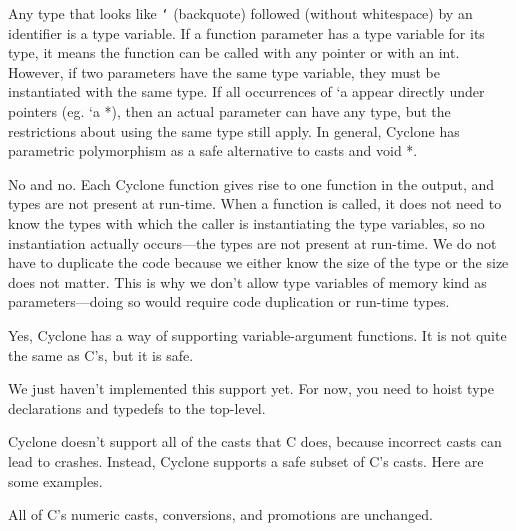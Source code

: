 Any type that looks like \texttt{`} (backquote) followed (without
whitespace) by an identifier is a type variable.  If a function
parameter has a type variable for its type, it means the function can
be called with any pointer or with an int.  However, if two parameters
have the same type variable, they must be instantiated with the same
type. If all occurrences of `a appear directly under pointers (eg. `a
*), then an actual parameter can have any type, but the restrictions
about using the same type still apply.  In general, Cyclone has
parametric polymorphism as a safe alternative to casts and void *.


No and no.  Each Cyclone function gives rise to one function in the
output, and types are not present at run-time.  When a function is
called, it does not need to know the types with which the caller is
instantiating the type variables, so no instantiation actually
occurs---the types are not present at run-time.  We do not have to
duplicate the code because we either know the size of the type or the
size does not matter.  This is why we don't allow type variables of
memory kind as parameters---doing so would require code duplication or
run-time types.


Yes, Cyclone has a way of supporting variable-argument functions.  It
is not quite the same as C's, but it is safe.


We just haven't implemented this support yet.  For now, you need to
hoist type declarations and typedefs to the top-level.


Cyclone doesn't support all of the casts that C does, because
incorrect casts can lead to crashes.  Instead, Cyclone supports a safe
subset of C's casts.  Here are some examples.

All of C's numeric casts, conversions, and promotions are unchanged.

